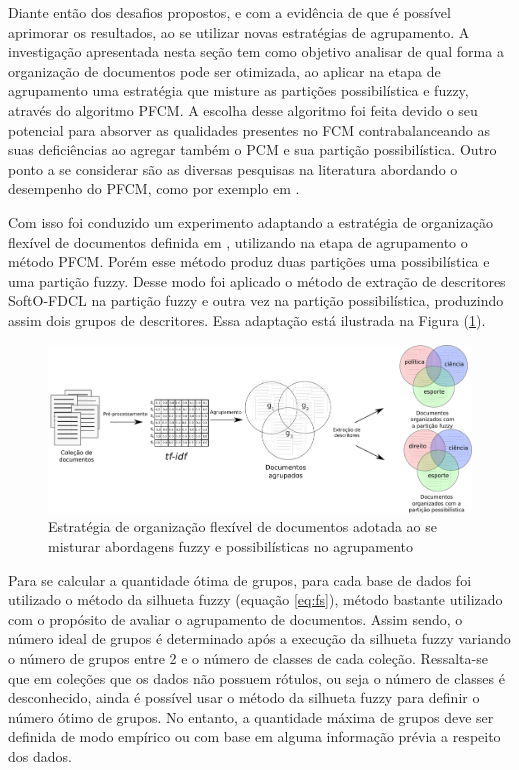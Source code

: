 Diante então dos desafios propostos, e com a evidência de que é possível aprimorar os resultados, ao
se utilizar novas estratégias de agrupamento. A investigação apresentada nesta seção tem como
objetivo analisar de qual forma a organização de documentos pode ser otimizada, ao aplicar na etapa
de agrupamento uma estratégia que misture as partições possibilística e fuzzy, através do algoritmo
PFCM. A escolha desse algoritmo foi feita devido o seu potencial para absorver as qualidades
presentes no FCM contrabalanceando as suas deficiências ao agregar também o PCM e sua partição
possibilística. Outro ponto a se considerar são as diversas pesquisas na literatura abordando o
desempenho do PFCM, 
como por exemplo em .

Com isso foi conduzido um experimento adaptando a estratégia de organização flexível de documentos
definida em ,
utilizando na etapa de agrupamento o método PFCM. Porém esse método produz duas partições uma
possibilística e uma partição fuzzy. Desse modo foi aplicado o método de extração de descritores
SoftO-FDCL na partição fuzzy e outra vez na partição possibilística, produzindo assim dois grupos de
descritores. Essa adaptação está ilustrada na Figura (\ref{fig:flexibleorganization}).

\begin{figure}[!htp] 
  \centering
  \includegraphics[width=1.0\columnwidth]{assets/process_pfcm.pdf} 
  \caption{Estratégia de organização flexível de documentos adotada ao se misturar abordagens fuzzy
  e possibilísticas no agrupamento} 
  \label{fig:flexibleorganization} 
\end{figure}

Para se calcular a quantidade ótima de grupos, para cada base de dados foi utilizado o
método da silhueta fuzzy (equação \ref{eq:fs}), método bastante utilizado com o propósito de avaliar
o agrupamento de documentos. Assim sendo, o número ideal de grupos é determinado após a execução da
silhueta fuzzy variando o número de grupos entre 2 e o número de classes de cada coleção.
Ressalta-se que em coleções que os dados não possuem rótulos, ou seja o número de classes é
desconhecido, ainda é possível usar o método da silhueta fuzzy para definir o número ótimo de
grupos. No entanto, a quantidade máxima de grupos deve ser definida de modo empírico ou com base em
alguma informação prévia a respeito dos dados. 

